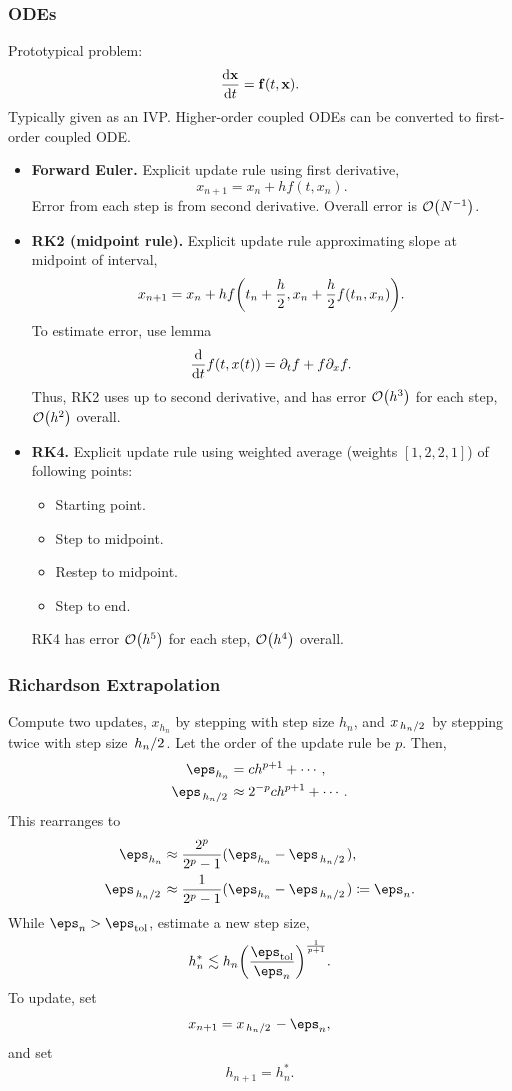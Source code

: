 \documentclass[12pt,letterpaper]{article}
\begin{document}
\subsubsection{ODEs}
Prototypical problem:
\[\dv{\vb{x}}{t}=\vb{f}(t,\vb{x}).\]
Typically given as an IVP. Higher-order coupled ODEs can be converted to first-order coupled ODE.
\begin{itemize}
    \item \textbf{Forward Euler.} Explicit update rule using first derivative,
    \[x_{n+1}=x_n+hf(t,x_n).\]
    Error from each step is from second derivative. Overall error is $\order{N^{-1}}$.
    \item \textbf{RK2 (midpoint rule).} Explicit update rule approximating slope at midpoint of interval,
    \[x_{n+1}=x_n+hf\qty(t_n+\frac h2,x_n+\frac h2f(t_n,x_n)).\]
    To estimate error, use lemma
    \[\dv{t}f(t,x(t))=\partial_tf+f\partial_xf.\]
    Thus, RK2 uses up to second derivative, and has error $\order{h^3}$ for each step, $\order{h^2}$ overall.
    \item \textbf{RK4.} Explicit update rule using weighted average (weights $[1,2,2,1]$) of following points:
    \begin{itemize}
        \item Starting point.
        \item Step to midpoint.
        \item Restep to midpoint.
        \item Step to end.
    \end{itemize}
    RK4 has error $\order{h^5}$ for each step, $\order{h^4}$ overall.
\end{itemize}
\subsubsection{Richardson Extrapolation}
Compute two updates, $x_{h_n}$ by stepping with step size $h_n$, and $x_{\flatfrac{h_n}2}$ by stepping twice with step size $\flatfrac{h_n}2$. Let the order of the update rule be $p$. Then,
\begin{align*}
    \eps_{h_n}&=ch^{p+1}+\dotsb,\\
    \eps_{\flatfrac{h_n}2}&\approx2^{-p}ch^{p+1}+\dotsb.
\end{align*}
This rearranges to
\begin{align*}
    \eps_{h_n}&\approx\frac{2^p}{2^p-1}(\eps_{h_n}-\eps_{\flatfrac{h_n}2}),\\
    \eps_{\flatfrac{h_n}2}&\approx\frac{1}{2^p-1}(\eps_{h_n}-\eps_{\flatfrac{h_n}2})\coloneq\eps_n.
\end{align*}
While $\eps_n>\eps_{\mathrm{tol}}$, estimate a new step size,
\[h^*_n\lesssim h_n\qty(\frac{\eps_{\mathrm{tol}}}{\eps_n})^{\frac{1}{p+1}}.\]
To update, set
\[x_{n+1}=x_{\flatfrac{h_n}2}-\eps_n,\]
and set
\[h_{n+1}=h^*_n.\]
\end{document}
